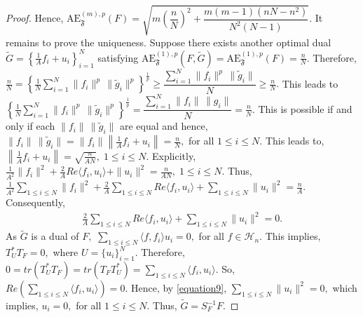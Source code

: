 \documentclass[10pt,a4paper]{amsart}
\begin{document}
\begin{proof}
Hence, $ \mathrm{AE}_{\mathfrak{F}}^{(m),p}(F) = \sqrt{ m\left( \dfrac{n}{N} \right)^2 + \dfrac{m(m-1)(nN - n^2)}{N^2(N-1)} }.$  It remains to prove the uniqueness. Suppose there exists another optimal dual \( \tilde{G} = \left\{ \frac{1}{A} f_i + u_i \right\}_{i=1}^N \) satisfying \(  \mathrm{AE}_{\mathfrak{F}}^{(1),p}(F, \tilde{G}) = \mathrm{AE}_{\mathfrak{F}}^{(1),p}(F) = \frac{n}{N} \). Therefore, $\frac{n}{N}=\left\{\frac{1}{N} \sum \limits_{i=1}^N\|f_i\|^p\,\| \tilde{g}_i \| ^p\right\}^{\frac{1}{p}} \geq \dfrac{\sum \limits_{i=1}^N\|f_i\|^p\,\| \tilde{g}_i \|}{N} \geq \frac{n}{N}. $ This leads to $\left\{\frac{1}{N} \sum \limits_{i=1}^N\|f_i\|^p\,\| \tilde{g}_i \| ^p\right\}^{\frac{1}{p}} = \dfrac{\sum \limits_{i=1}^N\|f_i\|\,\| g_i \|}{N} = \frac{n}{N}.$ This is possible if and only if  each $\|f_i\|\,\| \tilde{g}_i \|$ are equal and hence, $\|f_i\|\,\| \tilde{g}_i \| = \|f_i\|\left\| \frac{1}{A}f_i + u_i \right\|= \frac{n}{N},$ for all $1 \leq i \leq N.$ This leads to, $\left\| \frac{1}{A}f_i + u_i \right\| = \sqrt{\frac{n}{AN}},\;1 \leq i \leq N.$ Explicitly, $\frac{1}{A^2}\|f_i\|^2 + \frac{2}{A} Re\langle f_i, u_i \rangle + \|u_i\|^2 = \frac{n}{AN},\;1 \leq i \leq N.$ Thus, $\frac{1}{A^2}\sum\limits_{1 \leq i \leq N} \|f_i\|^2 + \frac{2}{A} \sum\limits_{1 \leq i \leq N} Re\langle f_i, u_i \rangle + \sum\limits_{1 \leq i \leq N} \|u_i\|^2  = \frac{n}{A}.$ Consequently,
 \begin{align}\label{equation9}
 	\frac{2}{A} \sum\limits_{1 \leq i \leq N} Re\langle f_i, u_i \rangle + \sum\limits_{1 \leq i \leq N} \|u_i\|^2 = 0.
 \end{align}
As $\tilde{G}$ is a dual of $F,$  $\sum\limits_{1\leq i \leq N} \langle f,f_i \rangle u_i =0,$ for all $f \in \mathcal{H}_n.$ This implies, $T_{U}^* T_F = 0,$ where $U= \{u_i\}_{i=1}^N.$ Therefore, $0 = tr(T_{U}^* T_F) = tr(T_F T_{U}^*) = \sum\limits_{1\leq i \leq N} \langle f_i,u_i \rangle. $ So, $Re\left( \sum\limits_{1\leq i \leq N} \langle f_i,u_i \rangle \right) =0.$ Hence, by \eqref{equation9}, $\sum\limits_{1\leq i \leq N} \|u_i\|^2 = 0,$ which implies, $u_i = 0,$ for all $1 \leq i \leq N.$ Thus, $\tilde{G} = S_{F}^{-1}F $.


\end{proof}
\end{document}

